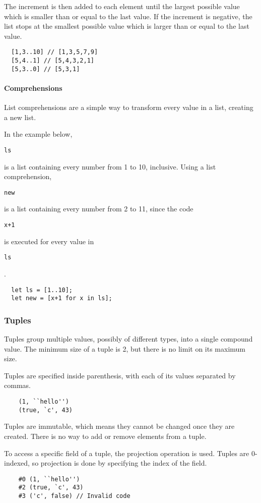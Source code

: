 \documentclass{article}
\def\code#1{\begin{footnotesize}\texttt{#1}\end{footnotesize}}
\begin{document}
The increment is then added to each element until the largest possible value which is smaller than or equal to the last value.
If the increment is negative, the list stops at the smallest possible value which is larger than or equal to the last value.

\begin{lstlisting}
  [1,3..10] // [1,3,5,7,9]
  [5,4..1] // [5,4,3,2,1]
  [5,3..0] // [5,3,1]
\end{lstlisting}

\paragraph{Comprehensions}
List comprehensions are a simple way to transform every value in a list, creating a new list.

In the example below, \code{ls} is a list containing every number from 1 to 10, inclusive.
Using a list comprehension, \code{new} is a list containing every number from 2 to 11, since the code \code{x+1} is executed for every value in \code{ls}.

\begin{lstlisting}
  let ls = [1..10];
  let new = [x+1 for x in ls];
\end{lstlisting}



\subsubsection{Tuples}

Tuples group multiple values, possibly of different types, into a single compound value.
The minimum size of a tuple is 2, but there is no limit on its maximum size.

Tuples are specified inside parenthesis, with each of its values separated by commas.

\begin{lstlisting}
    (1, ``hello'')
    (true, `c', 43)
\end{lstlisting}

Tuples are immutable, which means they cannot be changed once they are created.
There is no way to add or remove elements from a tuple.

To access a specific field of a tuple, the projection operation is used.
Tuples are 0-indexed, so projection is done by specifying the index of the field.

\begin{lstlisting}
    #0 (1, ``hello'')
    #2 (true, `c', 43)
    #3 ('c', false) // Invalid code
\end{lstlisting}
\end{document}
